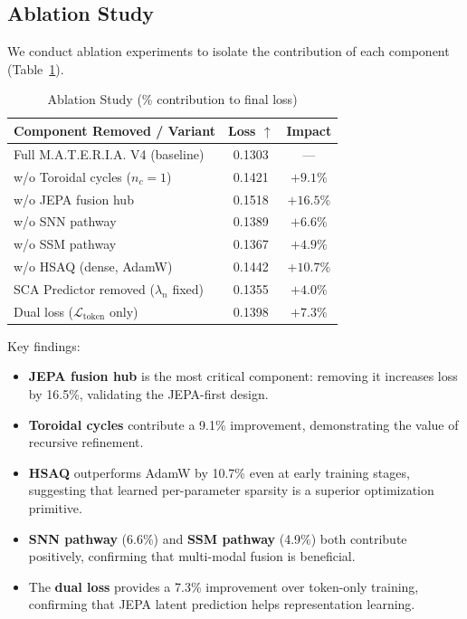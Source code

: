 \documentclass[conference]{IEEEtran}
\newcommand{\materia}{\textsc{M.A.T.E.R.I.A.}}
\begin{document}
\subsection{Ablation Study}

We conduct ablation experiments to isolate the contribution of each component (Table~\ref{tab:ablation}).

\begin{table}[h]
\centering
\caption{Ablation Study (\% contribution to final loss)}
\label{tab:ablation}
\small
\begin{tabular}{lcc}
\toprule
\textbf{Component Removed / Variant} & \textbf{Loss $\uparrow$} & \textbf{Impact} \\
\midrule
Full \materia{} V4 (baseline) & 0.1303 & --- \\
w/o Toroidal cycles ($n_c=1$) & 0.1421 & $+9.1\%$ \\
w/o JEPA fusion hub & 0.1518 & $+16.5\%$ \\
w/o SNN pathway & 0.1389 & $+6.6\%$ \\
w/o SSM pathway & 0.1367 & $+4.9\%$ \\
w/o HSAQ (dense, AdamW) & 0.1442 & $+10.7\%$ \\
SCA Predictor removed ($\lambda_n$ fixed) & 0.1355 & $+4.0\%$ \\
Dual loss ($\mathcal{L}_{\text{token}}$ only) & 0.1398 & $+7.3\%$ \\
\bottomrule
\end{tabular}
\end{table}

Key findings:
\begin{itemize}
\item \textbf{JEPA fusion hub} is the most critical component: removing it increases loss by 16.5\%, validating the JEPA-first design.
\item \textbf{Toroidal cycles} contribute a 9.1\% improvement, demonstrating the value of recursive refinement.
\item \textbf{HSAQ} outperforms AdamW by 10.7\% even at early training stages, suggesting that learned per-parameter sparsity is a superior optimization primitive.
\item \textbf{SNN pathway} (6.6\%) and \textbf{SSM pathway} (4.9\%) both contribute positively, confirming that multi-modal fusion is beneficial.
\item The \textbf{dual loss} provides a 7.3\% improvement over token-only training, confirming that JEPA latent prediction helps representation learning.
\end{itemize}
\end{document}
